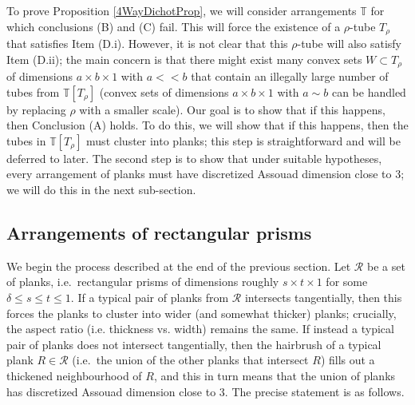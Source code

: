 \documentclass[letterpaper, reqno,11pt]{article}
\numberwithin{equation}{section}
\newcommand{\tubes}{\mathbb{T}}
\numberwithin{thm}{section}
\theoremstyle{remark}
\begin{document}
To prove Proposition \ref{4WayDichotProp}, we will consider arrangements $\tubes$ for which conclusions (B) and (C) fail. This will force the existence of a $\rho$-tube $T_\rho$ that satisfies Item (D.i). However, it is not clear that this $\rho$-tube will also satisfy Item (D.ii); the main concern is that there might exist many convex sets $W\subset T_\rho$ of dimensions $a\times b\times 1$ with $a<\!\!<b$ that contain an illegally large number of tubes from $\tubes[T_\rho]$ (convex sets of dimensions $a\times b\times 1$ with $a\sim b$ can be handled by replacing $\rho$ with a smaller scale). Our goal is to show that if this happens, then Conclusion (A) holds. To do this, we will show that if this happens, then the tubes in $\tubes[T_\rho]$ must cluster into planks; this step is straightforward and will be deferred to later. The second step is to show that under suitable hypotheses, every arrangement of planks must have discretized Assouad dimension close to 3; we will do this in the next sub-section. 



\subsection{Arrangements of rectangular prisms}\label{arrangeRecPrismSection}
We begin the process described at the end of the previous section. Let $\mathcal{R}$ be a set of planks, i.e.~rectangular prisms of dimensions roughly $s\times t\times 1$ for some $\delta\leq s\leq t\leq 1$. If a typical pair of planks from $\mathcal{R}$ intersects tangentially, then this forces the planks to cluster into wider (and somewhat thicker) planks; crucially, the aspect ratio (i.e. thickness vs. width) remains the same. If instead a typical pair of planks does not intersect tangentially, then the hairbrush of a typical plank $R\in\mathcal{R}$ (i.e.~the union of the other planks that intersect $R$) fills out a thickened neighbourhood of $R$, and this in turn means that the union of planks has discretized Assouad dimension close to 3. The precise statement is as follows.
\end{document}
